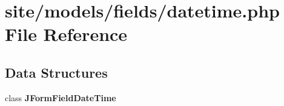\section{site/models/fields/datetime.php File Reference}
\label{datetime_8php}
\subsection*{Data Structures}
\begin{DoxyCompactItemize}
\item 
class \textbf{ J\+Form\+Field\+Date\+Time}
\end{DoxyCompactItemize}
